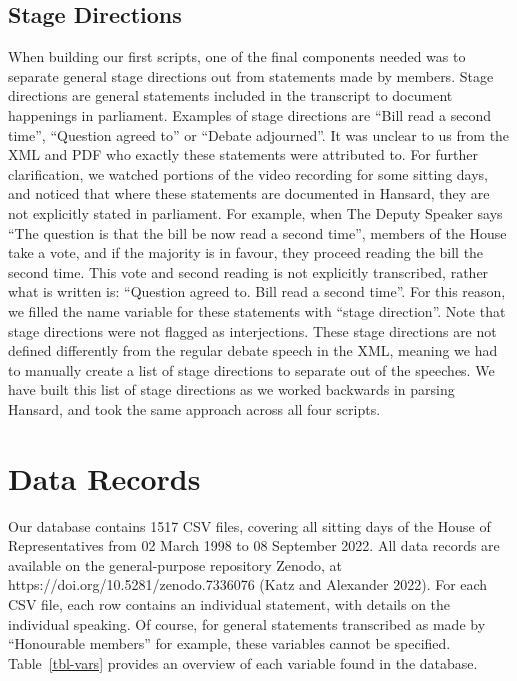 \documentclass[
  letterpaper,
  DIV=11,
  numbers=noendperiod]{scrartcl}
\begin{document}
\hypertarget{sec-stage}{%
\subsection{Stage Directions}\label{sec-stage}}

When building our first scripts, one of the final components needed was
to separate general stage directions out from statements made by
members. Stage directions are general statements included in the
transcript to document happenings in parliament. Examples of stage
directions are ``Bill read a second time'', ``Question agreed to'' or
``Debate adjourned''. It was unclear to us from the XML and PDF who
exactly these statements were attributed to. For further clarification,
we watched portions of the video recording for some sitting days, and
noticed that where these statements are documented in Hansard, they are
not explicitly stated in parliament. For example, when The Deputy
Speaker says ``The question is that the bill be now read a second
time'', members of the House take a vote, and if the majority is in
favour, they proceed reading the bill the second time. This vote and
second reading is not explicitly transcribed, rather what is written is:
``Question agreed to. Bill read a second time''. For this reason, we
filled the name variable for these statements with ``stage direction''.
Note that stage directions were not flagged as interjections. These
stage directions are not defined differently from the regular debate
speech in the XML, meaning we had to manually create a list of stage
directions to separate out of the speeches. We have built this list of
stage directions as we worked backwards in parsing Hansard, and took the
same approach across all four scripts.

\hypertarget{data-records}{%
\section{Data Records}\label{data-records}}

Our database contains 1517 CSV files, covering all sitting days of the
House of Representatives from 02 March 1998 to 08 September 2022. All
data records are available on the general-purpose repository Zenodo, at
https://doi.org/10.5281/zenodo.7336076 (Katz and Alexander 2022). For
each CSV file, each row contains an individual statement, with details
on the individual speaking. Of course, for general statements
transcribed as made by ``Honourable members'' for example, these
variables cannot be specified. Table~\ref{tbl-vars} provides an overview
of each variable found in the database.
\end{document}
